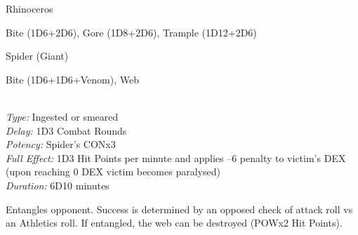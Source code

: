 \begin{samepage}
\begin{monsterbox}{Rhinoceros}
	\basics[%
        hitpoints  = 19, 
	majorwound = 10,
	damagemodifier = +2D6,
	powerpoints = 11,
	movementrate = 23m,
	armor = Thick hide (5 AP),
	]
	\rpghline%
	\stats[ %
		STR = 2D6+21 (26),
		CON = 3D6    (11),
		DEX = 2D6    (7),
		SIZ = 2D6+21 (26),
		INT = 3      (3),
		POW = 3D6    (11),
		CHA = 3      (3)
	]
	\rpghline%
	\begin{rpg-monsteraction}
		Bite (1D6+2D6), Gore (1D8+2D6), Trample (1D12+2D6)
	\end{rpg-monsteraction}
\end{monsterbox}
\end{samepage}


\begin{samepage}
\begin{monsterbox}{Spider (Giant)}
	\basics[%
        hitpoints  = 22, 
	majorwound = 11,
	damagemodifier = +1D6,
	powerpoints = 11,
	movementrate = {15m on land, 23m in web},
	armor = Chitin (4 AP),
	]
	\rpghline%
	\stats[ %
		STR = 2D6+12 (19),
		CON = 3D6+6  (17),
		DEX = 2D6+9  (16),
		SIZ = 4D6+12 (26),
		INT = 8      (8),
		POW = 3D6    (11),
		CHA = 2      (2)
	]
	\rpghline%
	\begin{rpg-monsteraction}
		Bite (1D6+1D6+Venom), Web
	\end{rpg-monsteraction}
	\begin{rpg-monsteraction}\\
		\textit{Type:} Ingested or smeared\\
		\textit{Delay:} 1D3 Combat Rounds\\
		\textit{Potency:} Spider's CONx3\\
		\textit{Full Effect:} 1D3 Hit Points per minute and applies –6 penalty to victim’s DEX (upon reaching 0 DEX victim becomes paralysed)\\ 
		\textit{Duration:} 6D10 minutes
	\end{rpg-monsteraction}
	\begin{rpg-monsteraction}[Web]
		Entangles opponent. Success is determined by an opposed check of attack roll vs an Athletics roll. If entangled, the web can be destroyed (POWx2 Hit Points).
	\end{rpg-monsteraction}

\end{monsterbox}
\end{samepage}


